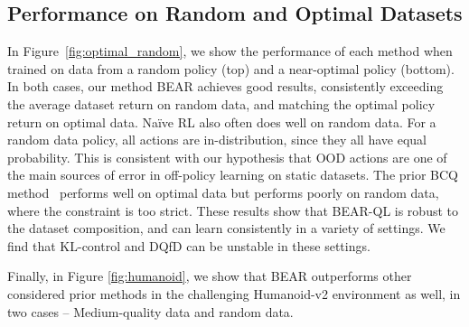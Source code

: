 \subsection{Performance on Random and Optimal Datasets}
In Figure~\ref{fig:optimal_random}, we show the performance of each method when trained on data from a random policy (top) and a near-optimal policy (bottom). In both cases, our method BEAR achieves good results, consistently exceeding the average dataset return on random data, and matching the optimal policy return on optimal data. Na\"{i}ve RL also often does well on random data. For a random data policy, all actions are in-distribution, since they all have equal probability. This is consistent with our hypothesis that OOD actions are one of the main sources of error in off-policy learning on static datasets. The prior BCQ method~\cite{fujimoto2018off} performs well on optimal data but performs poorly on random data, where the constraint is too strict. These results show that BEAR-QL is robust to the dataset composition, and can learn consistently in a variety of settings. We find that KL-control and DQfD can be unstable in these settings.  

{Finally, in Figure \ref{fig:humanoid}, we  show that BEAR outperforms other considered prior methods in the challenging Humanoid-v2 environment as well, in two cases -- Medium-quality data and random data.}

